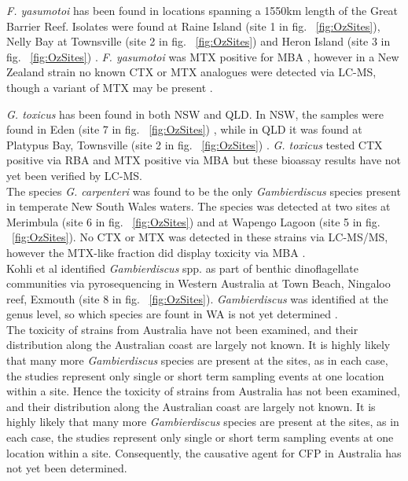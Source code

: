 \documentclass[12pt]{article}
\begin{document}
\emph{F. yasumotoi} has been found in locations spanning a 1550km length of the Great Barrier Reef. Isolates were found at Raine Island (site 1 in fig. ~\ref{fig:OzSites}), Nelly Bay at Townsville (site 2 in fig. ~\ref{fig:OzSites}) and Heron Island (site 3 in fig. ~\ref{fig:OzSites}) \cite{murray2014molecular}. \emph{F. yasumotoi} was MTX positive for MBA \cite{holmes1998gambierdiscus}, however in a New Zealand strain no known CTX or MTX analogues were detected via LC-MS, though a variant of MTX may be present \cite{rhodes2014gambierdiscus}.

\emph{G. toxicus} has been found in both NSW and QLD. In NSW, the samples were found in Eden (site 7 in fig. ~\ref{fig:OzSites}) \cite{hallegraeff2010algae}, while in QLD it was found at Platypus Bay, Townsville (site 2 in fig. ~\ref{fig:OzSites}) \cite{hallegraeff2010algae}. \emph{G. toxicus} tested CTX positive via RBA \cite{chinain2010growth} and MTX positive via MBA \cite{chinain1999morphology} but these bioassay results have not yet been verified by LC-MS.\\

The species \emph{G. carpenteri} was found to be the only \emph{Gambierdiscus} species present in temperate New South Wales waters. The species was detected at two sites at Merimbula (site 6 in fig. ~\ref{fig:OzSites}) and at Wapengo Lagoon (site 5 in fig. ~\ref{fig:OzSites}). No CTX or MTX was detected in these strains via LC-MS/MS, however the MTX-like fraction did display toxicity via MBA  \cite{kohli2014high}.\\ 

Kohli et al identified \emph{Gambierdiscus} spp. as part of benthic dinoflagellate communities via pyrosequencing in Western Australia at Town Beach, Ningaloo reef, Exmouth (site 8 in fig. ~\ref{fig:OzSites}).  \emph{Gambierdiscus} was identified at the genus level, so which species are fount in WA is not yet determined \cite{kohli2014cob}. \\

 The toxicity of strains from Australia have not been examined, and their distribution along the Australian coast are largely not known. It is highly likely that many more \emph{Gambierdiscus} species are present at the sites, as in each case, the studies represent only single or short term sampling events at one location within a site.
Hence the toxicity of strains from Australia has not been examined, and their distribution along the Australian coast are largely not known. It is highly likely that many more \emph{Gambierdiscus} species are present at the sites, as in each case, the studies represent only single or short term sampling events at one location within a site. Consequently, the causative agent for CFP in Australia has not yet been determined. \\
\end{document}
